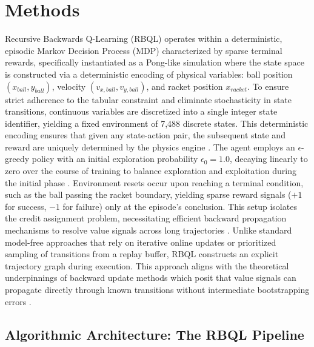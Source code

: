 \documentclass[manuscript, screen, review]{jair}
\begin{document}
\section{Methods}
Recursive Backwards Q-Learning (RBQL) operates within a deterministic, episodic Markov Decision Process (MDP) characterized by sparse terminal rewards, specifically instantiated as a Pong-like simulation where the state space is constructed via a deterministic encoding of physical variables: ball position $(x_{ball}, y_{ball})$, velocity $(v_{x,ball}, v_{y,ball})$, and racket position $x_{racket}$. To ensure strict adherence to the tabular constraint and eliminate stochasticity in state transitions, continuous variables are discretized into a single integer state identifier, yielding a fixed environment of 7,488 discrete states. This deterministic encoding ensures that given any state-action pair, the subsequent state and reward are uniquely determined by the physics engine \cite{Diekhoff2024RecursiveBQ}. The agent employs an $\epsilon$-greedy policy with an initial exploration probability $\epsilon_0 = 1.0$, decaying linearly to zero over the course of training to balance exploration and exploitation during the initial phase \cite{Perkins2025DQNPW}. Environment resets occur upon reaching a terminal condition, such as the ball passing the racket boundary, yielding sparse reward signals ($+1$ for success, $-1$ for failure) only at the episode's conclusion. This setup isolates the credit assignment problem, necessitating efficient backward propagation mechanisms to resolve value signals across long trajectories \cite{Lee2018SampleEfficientDR}. Unlike standard model-free approaches that rely on iterative online updates or prioritized sampling of transitions from a replay buffer, RBQL constructs an explicit trajectory graph during execution. This approach aligns with the theoretical underpinnings of backward update methods which posit that value signals can propagate directly through known transitions without intermediate bootstrapping errors \cite{Hong2022TopologicalER}.

\subsection{Algorithmic Architecture: The RBQL Pipeline}
\end{document}
